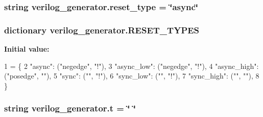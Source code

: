\hypertarget{namespaceverilog__generator_abb9b1a5f31f594c7d5f7e5ed5109b5ae}{
\subsubsection[{reset\-\_\-type}]{\setlength{\rightskip}{0pt plus 5cm}string verilog\-\_\-generator.\-reset\-\_\-type = \char`\"{}async\char`\"{}}}\label{namespaceverilog__generator_abb9b1a5f31f594c7d5f7e5ed5109b5ae}
\hypertarget{namespaceverilog__generator_a0cff72beee2a3140fb4e24f0df14fa24}{
\subsubsection[{R\-E\-S\-E\-T\-\_\-\-T\-Y\-P\-E\-S}]{\setlength{\rightskip}{0pt plus 5cm}dictionary verilog\-\_\-generator.\-R\-E\-S\-E\-T\-\_\-\-T\-Y\-P\-E\-S}}\label{namespaceverilog__generator_a0cff72beee2a3140fb4e24f0df14fa24}
{\bfseries Initial value\-:}
\begin{DoxyCode}
1 = \{
2     \textcolor{stringliteral}{"async"}: (\textcolor{stringliteral}{"negedge"}, \textcolor{stringliteral}{"!"}),
3     \textcolor{stringliteral}{"async\_low"}: (\textcolor{stringliteral}{"negedge"}, \textcolor{stringliteral}{"!"}),
4     \textcolor{stringliteral}{"async\_high"}: (\textcolor{stringliteral}{"posedge"}, \textcolor{stringliteral}{""}),
5     \textcolor{stringliteral}{"sync"}: (\textcolor{stringliteral}{""}, \textcolor{stringliteral}{"!"}),
6     \textcolor{stringliteral}{"sync\_low"}: (\textcolor{stringliteral}{""}, \textcolor{stringliteral}{"!"}),
7     \textcolor{stringliteral}{"sync\_high"}: (\textcolor{stringliteral}{""}, \textcolor{stringliteral}{""}),
8 \}
\end{DoxyCode}
\hypertarget{namespaceverilog__generator_aa57369757866dd14ee1936dffd0a5aa9}{
\subsubsection[{t}]{\setlength{\rightskip}{0pt plus 5cm}string verilog\-\_\-generator.\-t = \char`\"{} \char`\"{}}}\label{namespaceverilog__generator_aa57369757866dd14ee1936dffd0a5aa9}
